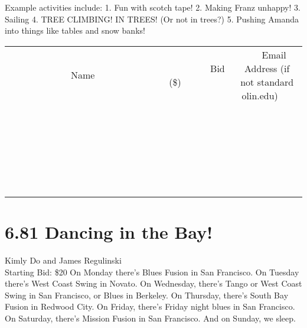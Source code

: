 \documentclass[11pt]{article}
\begin{document}
Example activities include:
1. Fun with scotch tape!
2. Making Franz unhappy!
3. Sailing 
4. TREE CLIMBING! IN TREES! (Or not in trees?)
5. Pushing Amanda into things like tables and snow banks!
\\[6ex]
\begin{tabular}{c c c}
~~~~~~~~~~~~~Name~~~~~~~~~~~~~ & ~~~~~~~~~Bid (\$)~~~~~~~~~  & ~~~Email Address (if not standard olin.edu)~~~\\
 & & \\
\hline
 & & \\
\hline
 & & \\
\hline
 & & \\
\hline
 & & \\
\hline
 & & \\
\hline
 & & \\
\hline
 & & \\
\hline
 & & \\
\hline
 & & \\
\hline
 & & \\
\hline
 & & \\
\hline
 & & \\
\hline
 & & \\
\hline
 & & \\
\hline
 & & \\
\hline
 & & \\
\hline
 & & \\
\hline
 & & \\
\hline
 & & \\
\hline
 & & \\
\hline
 & & \\
\hline
 & & \\
\hline
 & & \\
\hline
 & & \\
\hline
 & & \\
\hline
\end{tabular}
\newpage
\section*{6.81 Dancing in the Bay!}
Kimly Do and James Regulinski
\\
Starting Bid: \$20
\newline
On Monday there's Blues Fusion in San Francisco.
On Tuesday there's West Coast Swing in Novato.
On Wednesday, there's Tango or West Coast Swing in San Francisco, or Blues in Berkeley.
On Thursday, there's South Bay Fusion in Redwood City.
On Friday, there's Friday night blues in San Francisco.
On Saturday, there's Mission Fusion in San Francisco.
And on Sunday, we sleep.
\end{document}
